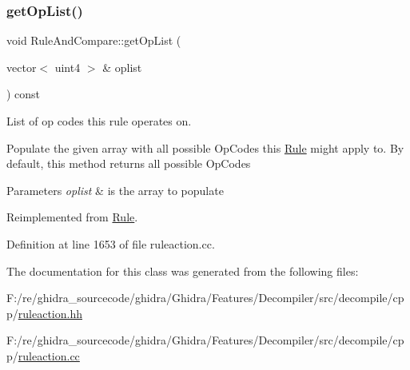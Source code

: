 \subsubsection{\texorpdfstring{getOpList()}{getOpList()}}
{\footnotesize\ttfamily void Rule\+And\+Compare\+::get\+Op\+List (\begin{DoxyParamCaption}\item[{vector$<$ uint4 $>$ \&}]{oplist }\end{DoxyParamCaption}) const\hspace{0.3cm}{\ttfamily [virtual]}}



List of op codes this rule operates on. 

Populate the given array with all possible Op\+Codes this \mbox{\hyperlink{class_rule}{Rule}} might apply to. By default, this method returns all possible Op\+Codes 
\begin{DoxyParams}{Parameters}
{\em oplist} & is the array to populate \\
\hline
\end{DoxyParams}


Reimplemented from \mbox{\hyperlink{class_rule_a4023bfc7825de0ab866790551856d10e}{Rule}}.



Definition at line 1653 of file ruleaction.\+cc.



The documentation for this class was generated from the following files\+:\begin{DoxyCompactItemize}
\item 
F\+:/re/ghidra\+\_\+sourcecode/ghidra/\+Ghidra/\+Features/\+Decompiler/src/decompile/cpp/\mbox{\hyperlink{ruleaction_8hh}{ruleaction.\+hh}}\item 
F\+:/re/ghidra\+\_\+sourcecode/ghidra/\+Ghidra/\+Features/\+Decompiler/src/decompile/cpp/\mbox{\hyperlink{ruleaction_8cc}{ruleaction.\+cc}}\end{DoxyCompactItemize}
